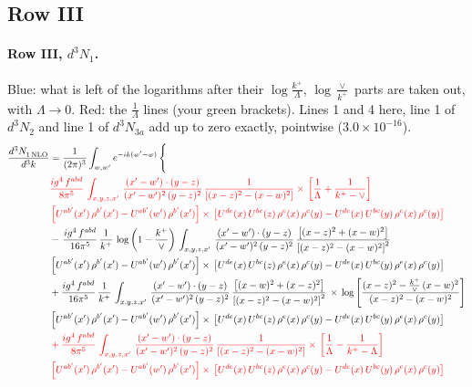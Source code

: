 \documentclass[10pt]{article}
\numberwithin{equation}{section}
\newcommand{\new}[1]{{\color{blue}#1}}
\newcommand{\old}[1]{{\color{red}#1}}
\newcommand{\rc}{\color{red}}
\begin{document}
\subsection{Row III}
\paragraph{Row III, $d^3N_1$.}
\new{Blue}: what is left of the logarithms after their $\log\frac{k^+}{\Lambda}$, $\log\frac{\vee}{k^+}$ parts are taken out, with $\Lambda\to0$. \old{Red}: the $\frac{1}{\Lambda}$ lines (your green brackets). Lines 1 and 4 here, line 1 of $d^3N_2$ and line 1 of $d^3N_{3a}$ add up to zero exactly, pointwise ($3.0\times10^{-16}$).
\begin{align}
   \frac{d^{3}N_{1\,\rm NLO}^{\rm}}{d^{3}k}  & =  \frac{1}{(2\pi)^{3}}  \int_{w, w^\prime} e^{-ik(w^\prime-w)}\, \Bigg\{\notag \\
& \rc  \frac{ig^{4}\,f^{abd}}{8\pi^{5}}\,\int_{x,y,z,x'}\, \frac{(x'-w')\cdot (y-z)}{(x'-w')^{2}\,(y-z)^{2}}\, \frac{1}{\left[(x-z)^{2}-(x-w)^{2}\right]}\times\, \left[\frac{1}{\Lambda}+\frac{1}{k^{+}-\vee}\right]\notag \\ & \rc  \left[U^{ab'}(x')\,\rho^{b'}(x')-U^{ab'}(w')\, \rho^{b'}(x')\right]\times\, \left[U^{de}(x)\,U^{bc}(z)\, \rho^{e}(x)\,\rho^{c}(y)-U^{de}(x)\,U^{bc}(y)\,\rho^{e}(x)\,\rho^{c}(y)\right] \notag \\
& -\,\frac{ig^{4}\,f^{abd}}{16\pi^{5}}\,\frac{1}{k^{+}}\,\log{\left(1-\frac{k^{+}}{\vee}\right)}\,\int_{x,y,z,x'}\, \frac{(x'-w')\cdot (y-z)}{(x'-w')^{2}\,(y-z)^{2}}\,\frac{\left[(x-z)^{2}+(x-w)^{2}\right]}{\left[(x-z)^{2}-(x-w)^{2}\right]^{2}}\notag \\ & \left[U^{ab'}(x')\,\rho^{b'}(x')-U^{ab'}(w')\, \rho^{b'}(x')\right]\times\, \left[U^{de}(x)\,U^{bc}(z)\, \rho^{e}(x)\,\rho^{c}(y)-U^{de}(x)\,U^{bc}(y)\,\rho^{e}(x)\,\rho^{c}(y)\right] \notag \\
&  +\frac{ig^{4}\,f^{abd}}{16\pi^{5}}\, \frac{1}{k^{+}}\,\int_{x,y,z,x'}\, \frac{(x'-w')\cdot (y-z)}{(x'-w')^{2}\,(y-z)^{2}}\, \frac{\left[(x-w)^{2}+(x-z)^{2}\right]}{\left[(x-z)^{2}-(x-w)^{2}\right]^{2}}\, \times\, \log{\left[\frac{(x-z)^{2}-\frac{k^{+}}{\vee}\,(x-w)^{2}}{(x-z)^{2}-(x-w)^{2}}\right]}\notag \\ & \left[U^{ab'}(x')\,\rho^{b'}(x')-U^{ab'}(w')\, \rho^{b'}(x')\right]\times\, \left[U^{de}(x)\,U^{bc}(z)\, \rho^{e}(x)\,\rho^{c}(y)-U^{de}(x)\,U^{bc}(y)\,\rho^{e}(x)\,\rho^{c}(y)\right] \notag \\
& \rc   + \frac{ig^{4}\,f^{abd}}{8\pi^{5}}\,\int_{x,y,z,x'}\, \frac{(x'-w')\cdot (y-z)}{(x'-w')^{2}\,(y-z)^{2}}\, \frac{1}{\left[(x-z)^{2}-(x-w)^{2}\right]}\times\, \left[\frac{1}{\Lambda}-\frac{1}{k^{+}-\Lambda}\right]\notag \\ & \rc  \left[U^{ab'}(x')\,\rho^{b'}(x')-U^{ab'}(w')\, \rho^{b'}(x')\right]\times\, \left[U^{de}(x)\,U^{bc}(z)\, \rho^{e}(x)\,\rho^{c}(y)-U^{de}(x)\,U^{bc}(y)\,\rho^{e}(x)\,\rho^{c}(y)\right] \notag \\

\end{align}
\end{document}
